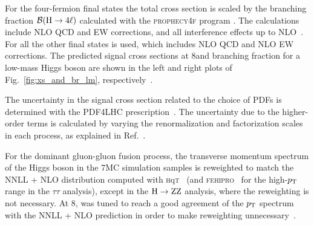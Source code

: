 \documentclass[11pt,twoside,a4paper,cmspaper,final,collab]{cms-tdr}
\begin{document}
For the four-fermion final states the total cross section is scaled by the branching fraction $\mathcal{B}(\mathrm{H}\rightarrow 4\ell)$ calculated
with the \textsc{prophecy4f} program \cite{Bredenstein:2006ha,Bredenstein:2006rh}.  The calculations include NLO QCD and EW corrections,
and all interference effects up
to NLO~\cite{LHCHiggsCrossSectionWorkingGroup:2011ti,Bredenstein:2006rh,Bredenstein:2006ha,Djouadi:1997yw,hdecay2,Actis:2008ts,Denner:2011mq,Dittmaier:2012vm}.
For all the other final states {\HDECAY} \cite{Djouadi:1997yw,hdecay2} is used, which includes NLO QCD and NLO EW corrections.
The predicted signal cross sections at 8\TeV and branching fraction for a low-mass Higgs boson are shown in the left and right plots
of Fig.~\ref{fig:xs_and_br_lm}, respectively~\cite{LHCHiggsCrossSectionWorkingGroup:2011ti,Dittmaier:2012vm}.


The uncertainty in the signal cross section related to
the choice of PDFs is determined with the PDF4LHC
prescription~\cite{Alekhin:2011sk,Botje:2011sn,Lai:2010vv,Martin:2009iq,Ball:2011mu}.
The uncertainty due to the higher-order terms
is calculated by varying the renormalization and factorization scales in each process,
as explained in Ref.~\cite{LHCHiggsCrossSectionWorkingGroup:2011ti}.


For the dominant gluon-gluon fusion process, the
transverse momentum spectrum of the Higgs boson in the 7\TeV MC simulation samples
is reweighted to match the
NNLL + NLO distribution computed
with \textsc{h}q\textsc{t}~\cite{Bozzi:2005wk,deFlorian:2011xf}
(and \textsc{fehipro}~\cite{FeHiPro1,FeHiPro2} for the high-$p_{\mathrm{T}}$ range in the $\tau\tau$ analysis),
except in the $\mathrm{H}\to\mathrm{Z}\mathrm{Z}$ analysis, where the reweighting is not necessary.
At 8\TeV,  \POWHEG was tuned to reach a good agreement of the $p_{\mathrm{T}}$ spectrum with
the NNLL + NLO prediction in order to make reweighting unnecessary~\cite{Dittmaier:2012vm}.
\end{document}
